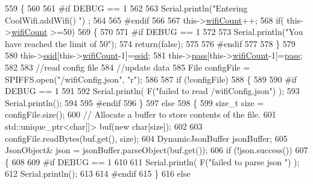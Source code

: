 \begin{DoxyCode}
559 \{
560 
561 \textcolor{preprocessor}{#if DEBUG == 1}
562     
563     Serial.println(\textcolor{stringliteral}{"Entering CoolWifi.addWifi() "}) ;
564 
565 \textcolor{preprocessor}{#endif  }
566     
567     this->\hyperlink{classCoolWifi_ab133bd92fcb895b884deecd6678592e4}{wifiCount}++;
568     \textcolor{keywordflow}{if}( this->\hyperlink{classCoolWifi_ab133bd92fcb895b884deecd6678592e4}{wifiCount} >=50)
569     \{
570     
571 \textcolor{preprocessor}{    #if DEBUG == 1}
572 
573         Serial.println(\textcolor{stringliteral}{"You have reached the limit of 50"});
574         \textcolor{keywordflow}{return}(\textcolor{keyword}{false});  
575     
576 \textcolor{preprocessor}{    #endif}
577 
578     \}
579 
580     this->\hyperlink{classCoolWifi_a893b21d0fed821438733bba2e73fb4c2}{ssid}[this->\hyperlink{classCoolWifi_ab133bd92fcb895b884deecd6678592e4}{wifiCount}-1]=\hyperlink{classCoolWifi_a893b21d0fed821438733bba2e73fb4c2}{ssid};
581     this->\hyperlink{classCoolWifi_a0c3332a149245aaad060b32593a54c9b}{pass}[this->\hyperlink{classCoolWifi_ab133bd92fcb895b884deecd6678592e4}{wifiCount}-1]=\hyperlink{classCoolWifi_a0c3332a149245aaad060b32593a54c9b}{pass};
582     
583     \textcolor{comment}{//read config file}
584     \textcolor{comment}{//update data}
585     File configFile = SPIFFS.open(\textcolor{stringliteral}{"/wifiConfig.json"}, \textcolor{stringliteral}{"r"});
586 
587     \textcolor{keywordflow}{if} (!configFile) 
588     \{
589     
590 \textcolor{preprocessor}{    #if DEBUG == 1 }
591 
592         Serial.println( F(\textcolor{stringliteral}{"failed to read /wifiConfig.json"}) );
593         Serial.println();
594 
595 \textcolor{preprocessor}{    #endif}
596     \}
597     \textcolor{keywordflow}{else}
598     \{
599         \textcolor{keywordtype}{size\_t} size = configFile.size();
600         \textcolor{comment}{// Allocate a buffer to store contents of the file.}
601         std::unique\_ptr<char[]> buf(\textcolor{keyword}{new} \textcolor{keywordtype}{char}[size]);
602 
603         configFile.readBytes(buf.get(), size);
604         DynamicJsonBuffer jsonBuffer;
605         JsonObject& json = jsonBuffer.parseObject(buf.get());
606         \textcolor{keywordflow}{if} (!json.success()) 
607         \{
608         
609 \textcolor{preprocessor}{        #if DEBUG == 1 }
610 
611             Serial.println( F(\textcolor{stringliteral}{"failed to parse json "}) );
612             Serial.println();
613         
614 \textcolor{preprocessor}{        #endif}
615         \} 
616         \textcolor{keywordflow}{else}

\end{DoxyCode}

